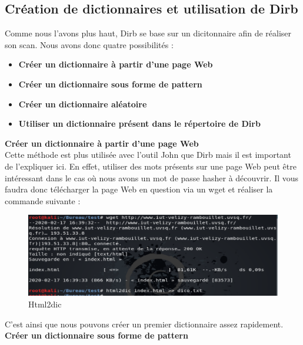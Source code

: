 \subsection{Création de dictionnaires et utilisation de Dirb}

Comme nous l'avons plus haut, Dirb se base sur un dicitonnaire afin de réaliser son scan. Nous avons donc quatre possibilités :

\begin{itemize}
    \item \textbf{Créer un dictionnaire à partir d'une page Web}
    \item \textbf{Créer un dictionnaire sous forme de pattern}
    \item \textbf{Créer un dictionnaire aléatoire}
    \item \textbf{Utiliser un dictionnaire présent dans le répertoire de Dirb}\\
\end{itemize}

\noindent \textbf{Créer un dictionnaire à partir d'une page Web}\\

Cette méthode est plus utilisée avec l'outil John que Dirb mais il est important de l'expliquer ici. En effet, utiliser des mots présents sur une page Web peut être intéressant dans le cas où nous avons un mot de passe hasher à découvrir. Il vous faudra donc télécharger la page Web en question via un wget et réaliser la commande suivante :

\begin{figure}[htp!]
  \centering
  \setlength\figureheight{7cm}
  \setlength\figurewidth{9cm}
  \includegraphics[width=1\textwidth]{oui/images/Dirb/html2dic.PNG}
  \caption{Html2dic}
  \label{fig:courbe-tikz}
\end{figure}

\newpage
C'est ainsi que nous pouvons créer un premier dictionnaire assez rapidement.\\

\noindent \textbf{Créer un dictionnaire sous forme de pattern}\\

